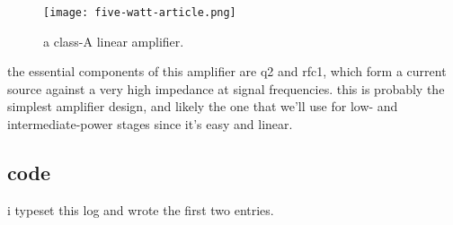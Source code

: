 \begin{enumerate}
	\begin{figure}[H]
		\centering
		\texttt{[image: five-watt-article.png]}
		\caption{a class-A linear amplifier.}
		\label{fig:five-watt-article}
	\end{figure}

	the essential components of this amplifier are \pr q2 and \pr rfc1,
	which form a current source against a very high impedance at signal
	frequencies. this is probably the simplest \rf amplifier design, and
	likely the one that we'll use for low- and intermediate-power stages
	since it's easy and linear.

\end{enumerate}

\subsection*{code}
i typeset this log and wrote the first two entries.
